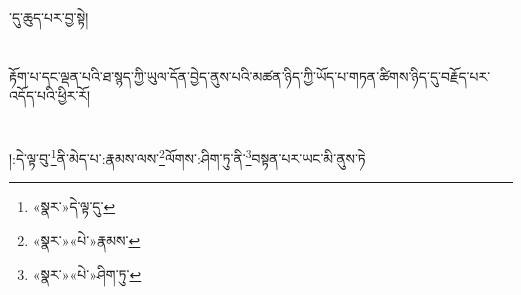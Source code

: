 ་དུ་ཆུད་པར་བྱ་སྟེ།\chapter{ }རྟོག་པ་དང་ལྡན་པའི་ཐ་སྙད་ཀྱི་ཡུལ་དོན་བྱེད་ནུས་པའི་མཚན་ཉིད་ཀྱི་ཡོད་པ་གཏན་ཚིགས་ཉིད་དུ་བརྗོད་པར་འདོད་པའི་ཕྱིར་རོ།\chapter{ }།:དེ་ལྟ་བུ་\footnote{«སྣར་»དེ་ལྟ་དུ་}ནི་མེད་པ་:རྣམས་ལས་\footnote{«སྣར་»«པེ་»རྣམས་}ལོགས་:ཤིག་ཏུ་ནི་\footnote{«སྣར་»«པེ་»ཤིག་ཏུ་}བསྟན་པར་ཡང་མི་ནུས་ཏེ